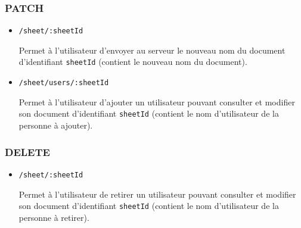 \documentclass[11pt, letterpaper]{article}
\begin{document}
\subsubsection*{\textbf{PATCH}} 
\begin{itemize}
    \item \verb+/sheet/:sheetId+

    Permet à l’utilisateur d’envoyer au serveur le nouveau nom du document d’identifiant \verb+sheetId+ (contient le nouveau nom du document).
    
    \item \verb+/sheet/users/:sheetId+

    Permet à l’utilisateur d’ajouter un utilisateur pouvant consulter et modifier son document d’identifiant \verb+sheetId+ (contient le nom d’utilisateur de la personne à ajouter).

\end{itemize}

\subsubsection*{\textbf{DELETE}} 
\begin{itemize}
    \item \verb+/sheet/:sheetId+

    Permet à l’utilisateur de retirer un utilisateur pouvant consulter et modifier son document d’identifiant \verb+sheetId+ (contient le nom d’utilisateur de la personne à retirer).

\end{itemize}
\end{document}

